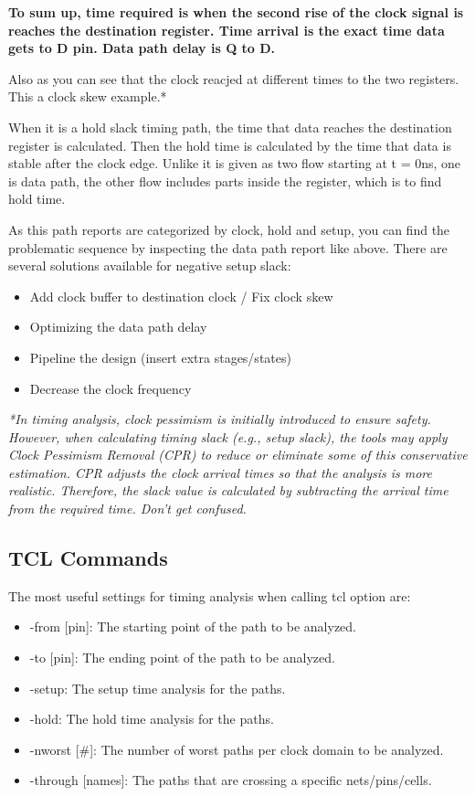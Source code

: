 \documentclass{report}
\begin{document}
\textbf{To sum up, time required is when the second rise of the clock signal is reaches the destination register. Time arrival is the exact time data gets to D pin. Data path delay is Q to D.}

Also as you can see that the clock reacjed at different times to the two registers. This a clock skew example.*

When it is a hold slack timing path, the time that data reaches the destination register is calculated. Then the hold time is calculated by the time that data is stable after the clock edge.
Unlike it is given as two flow starting at t = 0ns, one is data path, the other flow includes parts inside the register, which is to find hold time. 

As this path reports are categorized by clock, hold and setup, you can find the problematic sequence by inspecting the data path report like above. 
There are several solutions available for negative setup slack:
\begin{itemize}
    \item Add clock buffer to destination clock / Fix clock skew
    \item Optimizing the data path delay
    \item Pipeline the design (insert extra stages/states)
    \item Decrease the clock frequency
\end{itemize}

\textit{*In timing analysis, clock pessimism is initially introduced to ensure safety. However, when calculating timing slack (e.g., setup slack), the tools may apply Clock Pessimism Removal (CPR) to reduce or eliminate some of this conservative estimation. CPR adjusts the clock arrival times so that the analysis is more realistic. Therefore, the slack value is calculated by subtracting the arrival time from the required time. Don't get confused.}

\subsection{TCL Commands}
The most useful settings for timing analysis when calling tcl option are:
\begin{itemize} 
    \item -from [pin]: The starting point of the path to be analyzed.
    \item -to [pin]: The ending point of the path to be analyzed.
    \item -setup: The setup time analysis for the paths.
    \item -hold: The hold time analysis for the paths.
    \item -nworst [\#]: The number of worst paths per clock domain to be analyzed.
    \item -through [names]: The paths that are crossing a specific nets/pins/cells.
\end{itemize}
\end{document}
